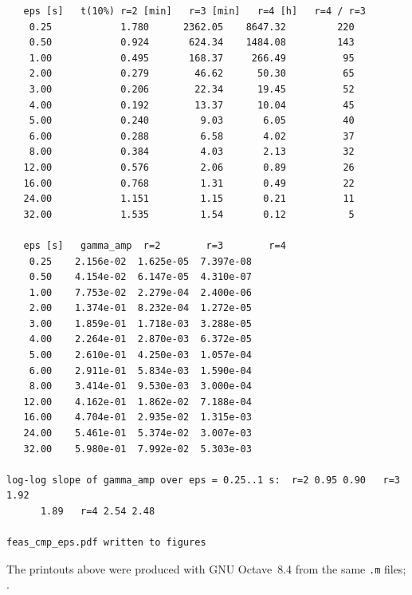 {\footnotesize\begin{verbatim}
   eps [s]   t(10%) r=2 [min]   r=3 [min]   r=4 [h]   r=4 / r=3
    0.25            1.780      2362.05    8647.32         220
    0.50            0.924       624.34    1484.08         143
    1.00            0.495       168.37     266.49          95
    2.00            0.279        46.62      50.30          65
    3.00            0.206        22.34      19.45          52
    4.00            0.192        13.37      10.04          45
    5.00            0.240         9.03       6.05          40
    6.00            0.288         6.58       4.02          37
    8.00            0.384         4.03       2.13          32
   12.00            0.576         2.06       0.89          26
   16.00            0.768         1.31       0.49          22
   24.00            1.151         1.15       0.21          11
   32.00            1.535         1.54       0.12           5

   eps [s]   gamma_amp  r=2        r=3        r=4
    0.25    2.156e-02  1.625e-05  7.397e-08
    0.50    4.154e-02  6.147e-05  4.310e-07
    1.00    7.753e-02  2.279e-04  2.400e-06
    2.00    1.374e-01  8.232e-04  1.272e-05
    3.00    1.859e-01  1.718e-03  3.288e-05
    4.00    2.264e-01  2.870e-03  6.372e-05
    5.00    2.610e-01  4.250e-03  1.057e-04
    6.00    2.911e-01  5.834e-03  1.590e-04
    8.00    3.414e-01  9.530e-03  3.000e-04
   12.00    4.162e-01  1.862e-02  7.188e-04
   16.00    4.704e-01  2.935e-02  1.315e-03
   24.00    5.461e-01  5.374e-02  3.007e-03
   32.00    5.980e-01  7.992e-02  5.303e-03

log-log slope of gamma_amp over eps = 0.25..1 s:  r=2 0.95 0.90   r=3 1.92
      1.89   r=4 2.54 2.48

feas_cmp_eps.pdf written to figures
\end{verbatim}}

\noindent
The printouts above were produced with GNU Octave~8.4 from the same \texttt{.m} files;
.
